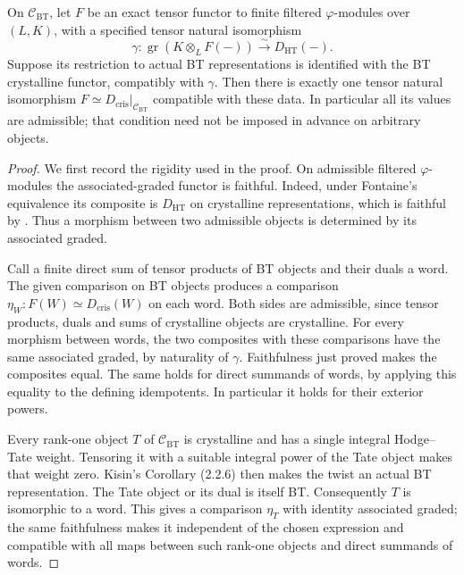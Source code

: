 \begin{theorem}\label{cat:J7}
On $\mathcal C_{\mathrm{BT}}$, let $F$ be an exact tensor functor to
finite filtered $\varphi$-modules over $(L,K)$, with a specified tensor
natural isomorphism
\[
 \gamma:\operatorname{gr}(K\otimes_LF(-))\xrightarrow{\sim}D_{\mathrm{HT}}(-).
\]
Suppose its restriction to actual BT representations is identified with
the BT crystalline functor, compatibly with $\gamma$.  Then there is
exactly one tensor natural isomorphism
$F\simeq D_{\mathrm{cris}}|_{\mathcal C_{\mathrm{BT}}}$ compatible
with these data.  In particular all its values are admissible; that
condition need not be imposed in advance on arbitrary objects.
\end{theorem}
\begin{proof}
We first record the rigidity used in the proof.  On admissible filtered
$\varphi$-modules the associated-graded functor is faithful.  Indeed,
under Fontaine's equivalence its composite is $D_{\mathrm{HT}}$ on
crystalline representations, which is faithful by
\cite[Proposition 1.6(iii)]{catFontaine1982}.  Thus a morphism between
two admissible objects is determined by its associated graded.

Call a finite direct sum of tensor products of BT objects and their
duals a word.  The given comparison on BT objects produces a comparison
$\eta_W:F(W)\simeq D_{\mathrm{cris}}(W)$ on each word.  Both sides are
admissible, since tensor products, duals and sums of crystalline objects
are crystalline.  For every morphism between words, the two composites
with these comparisons have the same associated graded, by naturality
of $\gamma$.  Faithfulness just proved makes the composites equal.
The same holds for direct summands of words, by applying this equality
to the defining idempotents.  In particular it holds for their exterior
powers.

Every rank-one object $T$ of $\mathcal C_{\mathrm{BT}}$ is crystalline
and has a single integral Hodge--Tate weight.  Tensoring it with a
suitable integral power of the Tate object makes that weight zero.
Kisin's Corollary (2.2.6) then makes the twist an actual BT
representation.  The Tate object or its dual is itself BT.
Consequently $T$ is isomorphic to a word.  This gives a comparison
$\eta_T$ with identity associated graded; the same faithfulness makes
it independent of the chosen expression and compatible with all maps
between such rank-one objects and direct summands of words.


\end{proof}
